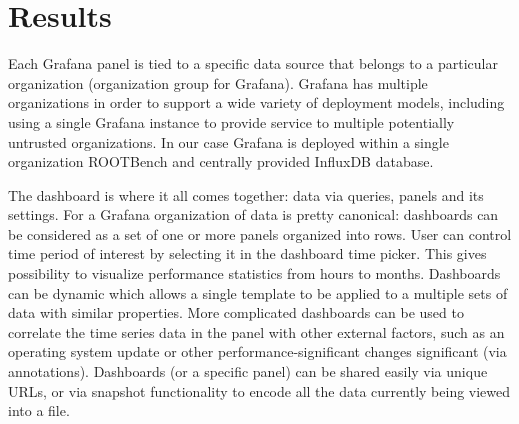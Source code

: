 \documentclass{webofc}
\begin{document}



\section{Results}
Each Grafana panel is tied to a specific data source that belongs to a particular organization (organization group for Grafana). Grafana has multiple organizations in order to support a wide variety of deployment models, including using a single Grafana instance to provide service to multiple potentially untrusted organizations. In our case Grafana is deployed within a single organization ROOTBench and centrally provided InfluxDB database.

The dashboard is where it all comes together: data via queries, panels and its settings. For a Grafana organization of data is pretty canonical: dashboards can be considered as a set of one or more panels organized into rows. User can control time period of interest by selecting it in the dashboard time picker. This gives possibility to visualize performance statistics from hours to months. Dashboards can be dynamic which allows a single template to be applied to a multiple sets of data with similar properties. More complicated dashboards can be used to correlate the time series data in the panel with other external factors, such as an operating system update or other performance-significant changes significant (via annotations). Dashboards (or a specific panel) can be shared easily via unique URLs, or via snapshot functionality to encode all the data currently being viewed into a file.
\end{document}
